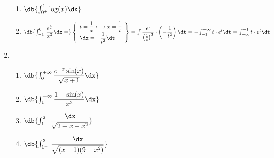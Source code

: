 \begin{enumerate}[label=\color{red}\textbf{\arabic*)}, leftmargin=*]
\begin{enumerate}[label=\color{red}\alph*)]
		\item $\db{\int_{0^+}^{1}\log(x)\dx}$
		\item $\db{\int_{-1}^{0^-}\dfrac{e^{\frac{1}{x}}}{x^3}\dx=}\left\{\begin{array}{l}
                  t=\dfrac{1}{x}\longleftrightarrow x=\dfrac{1}{t}\\
                  \dx=-\dfrac{1}{t^2}\dt
            \end{array}\right\}=\int \dfrac{e^t}{\left(\frac{1}{t}\right)^3}\cdot\left(-\dfrac{1}{t^2}\right)\dt=-\int_{-1}^{-\infty}t\cdot e^{t}\dt=\int_{-\infty}^{-1}t\cdot e^{t}\dt$
	\end{enumerate}
	\item {}
	\begin{enumerate}[label=\color{red}\alph*)]
		\item $\db{\int_{0}^{+\infty}\dfrac{e^{-x}\sin(x)}{\sqrt{x+1}}\dx}$
		\item $\db{\int_{1}^{+\infty}\dfrac{1-\sin(x)}{x^2}\dx}$
		\item $\db{\int_{1}^{2^-}\dfrac{\dx}{\sqrt{2+x-x^2}}}$
		\item $\db{\int_{1^+}^{3-}\dfrac{\dx}{\sqrt{(x-1)(9-x^2)}}}$
	\end{enumerate}
\end{enumerate}